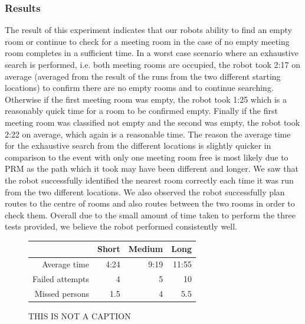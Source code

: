 \documentclass[conference]{IEEEtran}
\begin{document}
\subsubsection{Results}
The result of this experiment indicates that our robots ability to find an empty room or continue to check for a meeting room in the case of no empty meeting room completes in a sufficient time. In a worst case scenario where an exhaustive search is performed, i.e. both meeting rooms are occupied, the robot took 2:17 on average (averaged from the result of the runs from the two different starting locations) to confirm there are no empty rooms and to continue searching. Otherwise if the first meeting room was empty, the robot took 1:25 which is a reasonably quick time for a room to be confirmed empty. Finally if the first meeting room was classified not empty and the second was empty, the robot took 2:22 on average, which again is a reasonable time. The reason the average time for the exhaustive search from the different locations is slightly quicker in comparison to the event with only one meeting room free is most likely due to PRM as the path which it took may have been different and longer. We saw that the robot successfully identified the nearest room correctly each time it was run from the two different locations. We also observed the robot successfully plan routes to the centre of rooms and also routes between the two rooms in order to check them. Overall due to the small amount of time taken to perform the three tests provided, we believe the robot performed consistently well.
\begin{figure}
  \centering
    \begin{tabular}{r|r|r|r|}
    \cline{2-4}
    &Short&Medium&Long\\\hline
    \multicolumn{1}{|r|}{Average time}&4:24&9:19&11:55\\\hline
    \multicolumn{1}{|r|}{Failed attempts}&4&5&10\\\hline
    \multicolumn{1}{|r|}{Missed persons}&1.5&4&5.5\\\hline
  \end{tabular}
  \caption{THIS IS NOT A CAPTION}
  \label{fig:fullsystem}
\end{figure}
\end{document}
